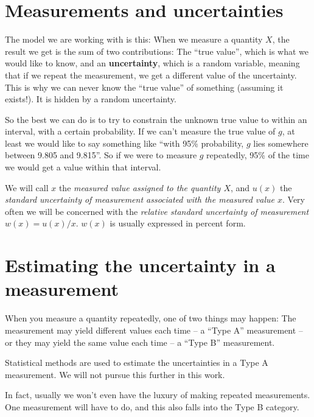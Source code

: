 \documentclass[justified]{tufte-handout}
\begin{document}
\section{Measurements and uncertainties}
The model we are working with is this: When we measure a quantity $X$, the
result we get is the sum of two contributions: The ``true value'',
which is what we would like to know, and an \textbf{uncertainty},
which is a random variable, meaning that if we repeat the measurement,
we get a different value of the uncertainty. This is why we can never
know the ``true value'' of something (assuming it exists!). It is
hidden by a random uncertainty. 

So the best we can do is to try to constrain the unknown true value to
within an interval, with a certain probability. If we can't measure
the true value of $g$, at least we would like to say something like
``with 95\% probability, $g$ lies somewhere between 9.805 and
9.815''. So if we were to measure $g$ repeatedly, 95\% of the time we
would get a value within that interval.

We will call $x$ the \textit{measured value assigned to the quantity $X$},
and $u(x)$ the \textit{standard uncertainty of measurement associated
  with the measured value $x$}. Very often we will be concerned with
the \textit{relative standard uncertainty of measurement}
$w(x)=u(x)/x$. $w(x)$ is usually expressed in percent form. 

\section{Estimating the uncertainty in a measurement}
When you measure a quantity repeatedly, one of two things may happen:
The measurement may yield different values each time -- a ``Type A''
measurement -- or they may yield the same value each time -- a ``Type
B'' measurement. 

Statistical methods are used to estimate the uncertainties in a Type A
measurement. We will not pursue this further in this work.

In fact, usually we won't even have the luxury of making repeated
measurements. One measurement will have to do, and this also falls
into the Type B category. 
\end{document}
